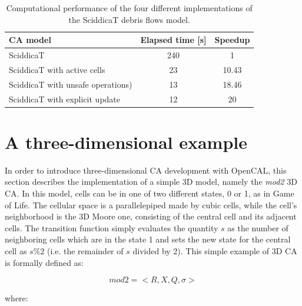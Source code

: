 \begin{table}
  \centering
  \begin{tabular}{l|c|c}
    \hline
    CA model & Elapsed time [s] & Speedup \\
    \hline
    \hline
    SciddicaT                           & 240 & 1\\
    SciddicaT with active cells         & 23  & 10.43\\
    SciddicaT with unsafe operations)   & 13  & 18.46\\
    SciddicaT with explicit update      & 12  & 20\\
    \hline
  \end{tabular}
  \caption{Computational performance of the four different
    implementations of the SciddicaT debris flows model.}
  \label{tab:speedup}
\end{table}


\section{A three-dimensional example}\label{sec:mod2}

In order to introduce three-dimensional CA development with
OpenCAL, this section describes the implementation of a simple 3D
model, namely the \emph{mod2} 3D CA. In this model, cells can be in
one of two different states, 0 or 1, as in Game of Life. The cellular
space is a parallelepiped made by cubic cells, while the cell's
neighborhood is the 3D Moore one, consisting of the central cell and
its adjacent cells. The transition function simply evaluates the
quantity $s$ as the number of neighboring cells which are in the
state 1 and sets the new state for the central cell as $s\%2$
(i.e. the remainder of $s$ divided by 2). This simple example of 3D CA
is formally defined as:

$$mod2 = < R, X, Q, \sigma >$$

where:


